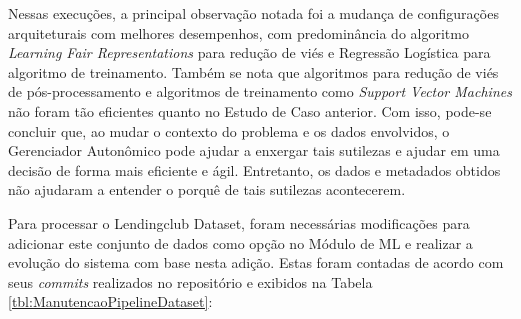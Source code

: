 \documentclass[Portugues,Final]{ic-tese-v3}
\begin{document}
\begin{table}[H]
\begin{center}
  \caption{Melhores configurações escolhidas pelo Gerenciador Autonômico \\ Uso dos algoritmos implementados - 25\% Avaliação/75\% \textit{Fairness}}
\label{tbl:ScoreMAPEKLendingclubGeral2575}
\end{center}
\end{table}

Nessas execuções, a principal observação notada foi a mudança de configurações arquiteturais com melhores desempenhos, com predominância do algoritmo \textit{Learning Fair Representations} para redução de viés e Regressão Logística para algoritmo de treinamento. Também se nota que algoritmos para redução de viés de pós-processamento e algoritmos de treinamento como \textit{Support Vector Machines} não foram tão eficientes quanto no Estudo de Caso anterior. Com isso, pode-se concluir que, ao mudar o contexto do problema e os dados envolvidos, o Gerenciador Autonômico pode ajudar a enxergar tais sutilezas e ajudar em uma decisão de forma mais eficiente e ágil. Entretanto, os dados e metadados obtidos não ajudaram a entender o porquê de tais sutilezas acontecerem.

Para processar o Lendingclub Dataset, foram necessárias modificações para adicionar este conjunto de dados como opção no Módulo de ML e realizar a evolução do sistema com base nesta adição. Estas foram contadas de acordo com seus \textit{commits} realizados no repositório e exibidos  na Tabela \ref{tbl:ManutencaoPipelineDataset}:
\end{document}
